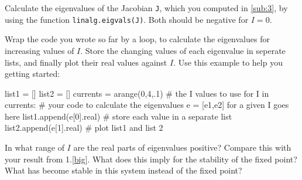 \documentclass[12pt]{article}
\begin{document}
\begin{Exercise}[title=Graphical bifurcation analysis]
\subQuestion Calculate the eigenvalues of the Jacobian \verb|J|, which you computed in \ref{sub:3}, by using the function \verb|linalg.eigvals(J)|. Both should be negative for $I=0$. 

\newpage

\Question[title=Bifurcation analysis]
Wrap the code you wrote so far by a loop, to calculate the eigenvalues for increasing values of $I$. Store the changing values of each eigenvalue in seperate lists, and finally plot their real values against $I$. Use this example to help you getting started:

\begin{code}
list1 = []
list2 = []
currents = arange(0,4,.1) # the I values to use
for I in currents:
	# your code to calculate the eigenvalues e = [e1,e2] for a given I goes here
	list1.append(e[0].real) # store each value in a separate list
	list2.append(e[1].real) 
# plot list1 and list 2
\end{code}

In what range of $I$ are the real parts of eigenvalues positive? Compare this with your result from 1.\ref{big}. What does this imply for the stability of the fixed point? What has become stable in this system instead of the fixed point?

\end{Exercise}
\end{document}
